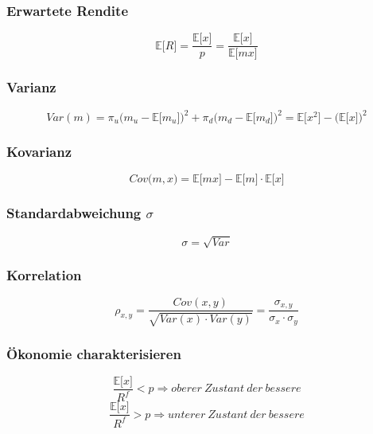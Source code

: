 \subsubsection{Erwartete Rendite}
\begin{equation}
	\mathbb{E} \big\lbrack R \big\rbrack = \frac{\mathbb{E} \big\lbrack x \big\rbrack}{p} = \frac{\mathbb{E} \big\lbrack x \big\rbrack}{\mathbb{E} \big\lbrack mx \big\rbrack}
\end{equation}

\subsubsection{Varianz}
\begin{equation}
	Var(m) = \pi_u \Big(m_u - \mathbb{E} \big\lbrack m_u \big\rbrack\Big)^2 + \pi_d \Big(m_d - \mathbb{E} \big\lbrack m_d \big\rbrack\Big)^2 = \mathbb{E} \big\lbrack x^2 \big\rbrack - \Big( \mathbb{E} \big\lbrack x \big\rbrack \Big)^2
\end{equation}

\subsubsection{Kovarianz}
\begin{equation}
	Cov\big(m,x\big) = \mathbb{E} \big\lbrack m x \big\rbrack - \mathbb{E} \big\lbrack m \big\rbrack \cdot \mathbb{E} \big\lbrack x \big\rbrack
\end{equation}

\subsubsection{Standardabweichung \(\sigma\)}
\begin{equation}
	\sigma = \sqrt{Var}
\end{equation}

\subsubsection{Korrelation}
\begin{equation}
	\rho_{x,y} = \frac{Cov(x,y)}{\sqrt{Var(x) \cdot Var(y)}} = \frac{\sigma_{x,y}}{\sigma_x \cdot \sigma_y}
\end{equation}

\subsubsection{Ökonomie charakterisieren}
\begin{equation}
	\frac{\mathbb{E} \big\lbrack x \big\rbrack}{R^f} < p \Rightarrow oberer~Zustant~der~bessere
\end{equation}
\begin{equation}
	\frac{\mathbb{E} \big\lbrack x \big\rbrack}{R^f} > p \Rightarrow unterer~Zustant~der~bessere
\end{equation}


